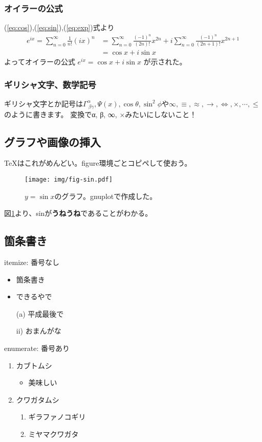 \documentclass[11pt,b5paper,papersize,dvipdfmx]{jsarticle}
\begin{document}
%
\subsubsection{オイラーの公式}
(\ref{eq:cos}),(\ref{eq:sin}),(\ref{eq:exp})式より
\begin{align*}
    e^{ix} = \sum_{n=0}^\infty \frac{1}{n!} (ix)^n
    &= \sum_{n=0}^\infty \frac{(-1)^n}{(2n)!} x^{2n} + i\sum_{n=0}^\infty \frac{(-1)^n}{(2n+1)!} x^{2n+1} \\
    &= \cos x + i\sin x
\end{align*}
よってオイラーの公式 $ e^{ix} = \cos x + i\sin x $ が示された。

%
\subsubsection{ギリシャ文字、数学記号}
ギリシャ文字とか記号は$\Gamma^\alpha_{\ \beta\gamma}, \Psi(x), \cos\theta, \sin^2\phi$や$\infty, \equiv, \approx, \to, \iff, \times, \cdots, \le$のように書きます。
変換でα, β, ∞, ×みたいにしないこと！

%
\subsection{グラフや画像の挿入}
\TeX はこれがめんどい。figure環境ごとコピペして使おう。

\begin{figure}[htbp]
  \centering
  \texttt{[image: img/fig-sin.pdf]}
  \caption{$y=\sin x$のグラフ。gnuplotで作成した。}
  \label{fig:sin}
\end{figure}

図\ref{fig:sin}より、sinが{\bfseries うねうね}であることがわかる。

%
\subsection{箇条書き}
itemize: 番号なし
\begin{itemize}
  \item 箇条書き
  \item できるやで
  \item[(a)] 平成最後で
  \item[ii)] おまんがな
\end{itemize}

enumerate: 番号あり
\begin{enumerate}
  \item カブトムシ
  \begin{itemize}
    \item 美味しい
  \end{itemize}
  \item クワガタムシ
  \begin{enumerate}
      \item ギラファノコギリ
      \item ミヤマクワガタ
  \end{enumerate}
\end{enumerate}
\end{document}
